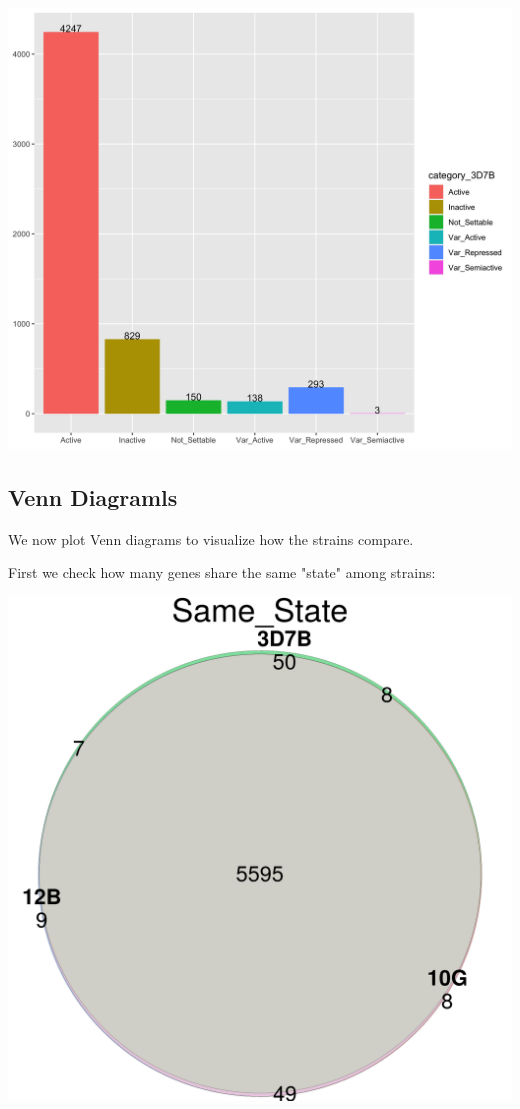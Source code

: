 \documentclass[11pt]{article}
\begin{document}
\begin{center}
\includegraphics[width=.9\linewidth]{./Plots/histogram_3D7B.png}
\end{center}

\subsection{Venn Diagramls}
\label{sec:orgdceb161}
We now plot Venn diagrams to visualize how the strains compare.

First we check how many genes share the same "state" among strains:

\begin{center}
\includegraphics[width=.9\linewidth]{./Plots/venn_Same_State.png}
\end{center}
\end{document}
